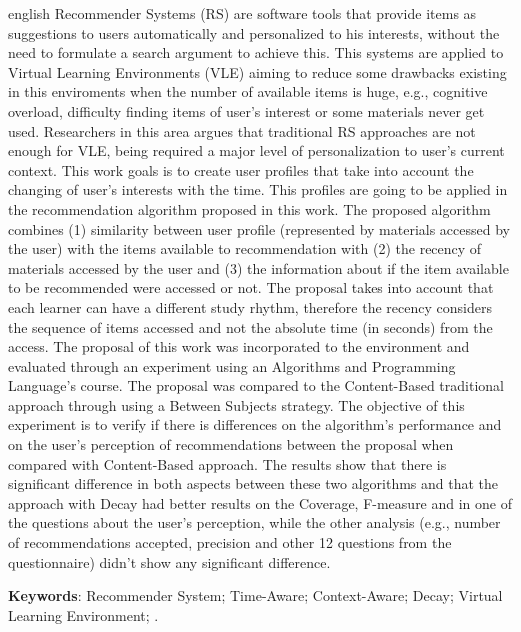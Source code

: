 \begin{resumo}[Abstract]
 \begin{otherlanguage*}{english}
  	Recommender Systems (RS) are software tools that provide items as suggestions to users automatically and personalized to his
    interests, without the need to formulate a search argument to achieve this. This systems are applied to Virtual Learning
    Environments (VLE) aiming to reduce some drawbacks existing in this enviroments when the number of available items is
    huge, e.g., cognitive overload, difficulty finding items of user's interest or some materials never get used. Researchers
    in this area argues that traditional RS approaches are not enough for VLE, being required a major level of personalization
    to user's current context. This work goals is to create user profiles that take into account the changing of user's interests
    with the time. This profiles are going to be applied in the recommendation algorithm proposed in this work. The proposed
    algorithm combines (1) similarity between user profile (represented by materials accessed by the user) with the items
    available to recommendation with (2) the recency of materials accessed by the user and (3) the information about if
    the item available to be recommended were accessed or not. The proposal takes into account that each learner can have
    a different study rhythm, therefore the recency considers the sequence of items accessed and not the absolute time (in
    seconds) from the access. The proposal of this work was incorporated to the \adaptwebspace environment and evaluated
    through an experiment using an Algorithms and Programming Language's course. The proposal was compared to the Content-Based traditional approach
    through using a Between Subjects strategy. The objective of this experiment is to verify if there is differences
    on the algorithm's performance and on the user's perception of recommendations between the proposal when compared
    with Content-Based approach. The results show that there is significant difference in both aspects between these two
    algorithms and that the approach with Decay had better results on the Coverage, F-measure and in one of the
    questions about the user's perception, while the other analysis (e.g., number of recommendations accepted,
    precision and other 12 questions from the questionnaire) didn't show any significant difference.
    \vspace{\onelineskip}

    \noindent
    \textbf{Keywords}: Recommender System; Time-Aware; Context-Aware; Decay; Virtual Learning Environment; \adaptweb.
 \end{otherlanguage*}
\end{resumo}

\listoffigures*
\cleardoublepage

\listoftables*
\cleardoublepage